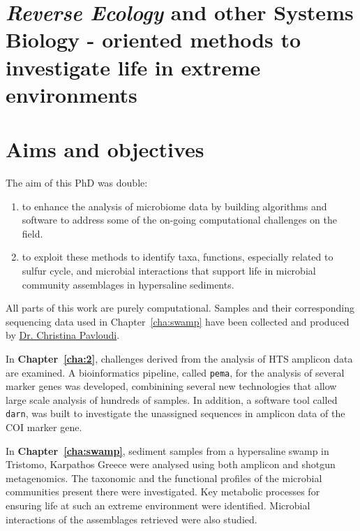 \section{\textit{Reverse Ecology} and other Systems Biology - oriented methods to investigate life in extreme environments}




\section{Aims and objectives}

   The aim of this PhD was double:
   \begin{enumerate}
      \item to enhance the analysis of microbiome data by building algorithms and software 
            to address some of the on-going computational challenges on the field.
      \item to exploit these methods to identify taxa, functions, especially related to sulfur cycle, 
            and microbial interactions that support life in microbial community assemblages in hypersaline sediments.
   \end{enumerate}
   All parts of this work are purely computational. 
   Samples and their corresponding sequencing data used in Chapter~\ref{cha:swamp} have been collected 
   and produced by \href{https://scholar.google.com/citations?user=3zs1rNkAAAAJ&hl=en&oi=sra}{Dr. Christina Pavloudi}. 

   In \textbf{Chapter~\ref{cha:2}}, challenges derived from the analysis of HTS amplicon data are examined.
   A bioinformatics pipeline, called \texttt{pema}, for the analysis of several marker genes was developed, combinining several new technologies that allow large scale analysis of hundreds of samples. 
   In addition, a software tool called \texttt{darn}, was built to investigate the unassigned sequences in amplicon data of the COI marker gene. 

   In \textbf{Chapter~\ref{cha:swamp}}, sediment samples from a hypersaline swamp in Tristomo, Karpathos Greece were analysed using both amplicon and shotgun metagenomics. 
   The taxonomic and the functional profiles of the microbial communities present there were investigated. 
   Key metabolic processes for ensuring life at such an extreme environment were identified.
   Microbial interactions of the assemblages retrieved were also studied. 

